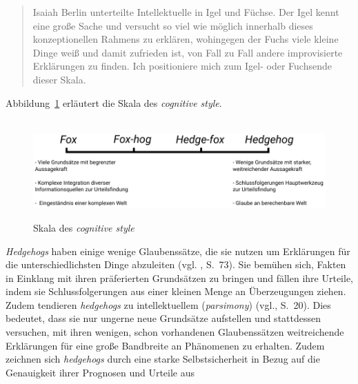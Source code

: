 \begin{quotation}
Isaiah Berlin unterteilte Intellektuelle in Igel und Füchse. Der Igel kennt eine
große Sache und versucht so viel wie möglich innerhalb dieses konzeptionellen
Rahmens zu erklären, wohingegen der Fuchs viele kleine Dinge weiß und damit
zufrieden ist, von Fall zu Fall andere improvisierte Erklärungen zu
finden. Ich positioniere mich zum Igel- oder Fuchsende dieser Skala.
\end{quotation}
Abbildung~\ref{pic:Hedgehog_Fox} erläutert die Skala des \emph{cognitive style}.
\\ \\
\begin{figure}%
\centering
\caption{Skala des \emph{cognitive style}%
}
\includegraphics[scale=1]{Grafiken/Hedgehog_Fox.pdf} 
\label{pic:Hedgehog_Fox}
\end{figure}
\emph{Hedgehogs} haben einige wenige Glaubenssätze, die sie nutzen um
Erklärungen für die unterschiedlichsten Dinge abzuleiten (vgl. \cite{Tetlock},
S.~73). Sie bemühen sich, Fakten in Einklang mit ihren präferierten Grundsätzen
zu bringen und fällen ihre Urteile, indem sie Schlussfolgerungen aus einer
kleinen Menge an Überzeugungen ziehen. Zudem tendieren \emph{hedgehogs}
zu intellektuellem \grqq (\emph{parsimony}) (vgl.\cite{Tetlock}, 
S.~20). Dies bedeutet, dass sie nur ungerne neue Grundsätze
aufstellen und stattdessen versuchen, mit ihren wenigen, schon vorhandenen
Glaubenssätzen weitreichende Erklärungen für eine große Bandbreite an Phänomenen
zu erhalten. Zudem zeichnen sich \emph{hedgehogs} durch eine starke
Selbstsicherheit in Bezug auf die Genauigkeit ihrer Prognosen und Urteile aus
